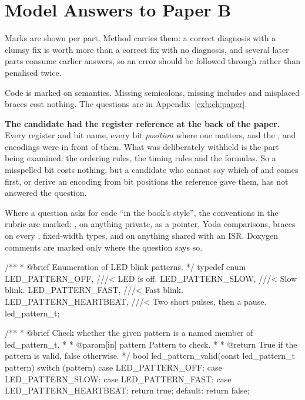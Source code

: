 
\renewcommand{\answerprefix}{ansb}

\chapter{Model Answers to Paper B}
\label{ansb:ch:answers}

Marks are shown per part. Method carries them: a correct diagnosis with a clumsy fix is worth more
than a correct fix with no diagnosis, and several later parts consume earlier answers, so an error
should be followed through rather than penalised twice.

Code is marked on semantics. Missing semicolons, missing includes and misplaced braces cost nothing.
The questions are in Appendix~\ref{exb:ch:paper}.

\textbf{The candidate had the register reference at the back of the paper.} Every register and bit
name, every bit \emph{position} where one matters, and the , 
and  encodings were in front of them. What was deliberately withheld is the part
being examined: the ordering rules, the timing rules and the formulas. So a misspelled bit costs
nothing, but a candidate who cannot say which of  and  comes first, or derive
an encoding from bit positions the reference gave them, has not answered the question.

Where a question asks for code ``in the book's style'', the conventions in the rubric are marked:
,  on anything private,  as a pointer, Yoda comparisons,
braces on every , fixed-width types, and  on anything shared with an ISR.
Doxygen comments are marked only where the question says so.


\begin{ccode}
/**
 * @brief Enumeration of LED blink patterns.
 */
typedef enum
{
    LED_PATTERN_OFF,       ///< LED is off.
    LED_PATTERN_SLOW,      ///< Slow blink.
    LED_PATTERN_FAST,      ///< Fast blink.
    LED_PATTERN_HEARTBEAT, ///< Two short pulses, then a pause.
} led_pattern_t;

/**
 * @brief Check whether the given pattern is a named member of led_pattern_t.
 *
 * @param[in] pattern Pattern to check.
 *
 * @return True if the pattern is valid, false otherwise.
 */
bool led_pattern_valid(const led_pattern_t pattern)
{
    switch (pattern)
    {
        case LED_PATTERN_OFF:
        case LED_PATTERN_SLOW:
        case LED_PATTERN_FAST:
        case LED_PATTERN_HEARTBEAT:
            return true;
        default:
            return false;
    }
}
\end{ccode}

